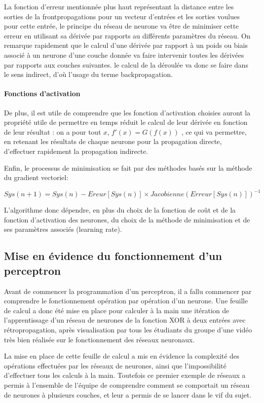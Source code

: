 \documentclass[
    10pt,
    a4paper,
    oneside,
    headinclude,footinclude,
    BCOR=5mm,
    captions=tableabove
]{scrartcl}
\begin{document}
La fonction d'erreur mentionnée plus haut représentant la distance entre les sorties de la frontpropagations pour un vecteur d'entrées et les sorties voulues pour cette entrée, le principe du réseau de neurone va être de minimiser cette erreur en utilisant sa dérivée par rapports au différents paramètres du réseau. On remarque rapidement que le calcul d'une dérivée par rapport à un poids ou biais associé à un neurone d'une couche donnée va faire intervenir toutes les dérivées par rapports aux couches suivantes. le calcul de la déroulée va donc se faire dans le sens indirect, d'où l'usage du terme backpropagation.

\paragraph{Fonctions d'activation}
De plus, il est utile de comprendre que les fonction d'activation choisies auront la propriété utile de permettre en temps réduit le calcul de leur dérivée en fonction de leur résultat : on a pour tout $x$, $f'(x)=G(f(x))$ , ce qui va permettre, en retenant les résultats de chaque neurone pour la propagation directe, d'effectuer rapidement la propagation indirecte. 

Enfin, le processus de minimisation se fait par des méthodes basés sur la méthode du gradient vectoriel:

$$Sys(n+1) = Sys(n) - Ereur[Sys(n)] \times Jacobienne(Erreur[Sys(n)]) ^{-1} $$ 

L'algorithme donc dépendre, en plus du choix de la fonction de coût et de la fonction d'activation des neurones, du choix de la méthode de minimisation et de ses paramètres associés (learning rate).

\subsection{Mise en évidence du fonctionnement d'un perceptron}
Avant de commencer la programmation d'un perceptron, il a fallu commencer par comprendre le fonctionnement opération par opération d'un neurone. Une feuille de calcul a donc été mise en place pour calculer à la main une itération de l'apprentissage d'un réseau de neurones de la fonction XOR à deux entrées avec rétropropagation, après visualisation par tous les étudiants du groupe d'une vidéo très bien réalisée sur le fonctionnement des réseaux neuronaux.

La mise en place de cette feuille de calcul a mis en évidence la complexité des opérations effectuées par les réseaux de neurones, ainsi que l'impossibilité d'effectuer tous les calculs à la main. Toutefois ce premier exemple de réseaux a permis à l'ensemble de l'équipe de comprendre comment se comportait un réseau de neurones à plusieurs couches, et leur a permis de se lancer dans le vif du sujet. 
\end{document}
